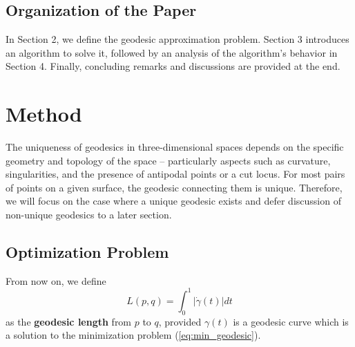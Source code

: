 \documentclass[12pt]{amsart}
\theoremstyle{definition}
\theoremstyle{remark}
\numberwithin{equation}{section}
\numberwithin{equation}{section}
\begin{document}
\subsection{Organization of the Paper} 
In Section 2, we define the geodesic approximation problem. Section 3 introduces an algorithm to solve it, followed by an analysis of the algorithm's behavior in Section 4. Finally, concluding remarks and discussions are provided at the end.


\section{Method}\label{sec:method}

The uniqueness of geodesics in three-dimensional spaces depends on the specific geometry and topology of the space -- particularly aspects such as curvature, singularities, and the presence of antipodal points or a cut locus. For most pairs of points on a given surface, the geodesic connecting  them is unique. Therefore, we will focus on the case where a unique geodesic exists and defer discussion of non-unique geodesics to a later section. 

\subsection{Optimization Problem}
From now on, we define 
$$
L(p, q)=\int_0^1 |\dot \gamma(t)|dt
$$
as the \textbf{geodesic length} from $p$ to $q$, provided $\gamma(t)$ is a geodesic curve which is a solution to the minimization problem (\ref{eq:min_geodesic}).
\end{document}
